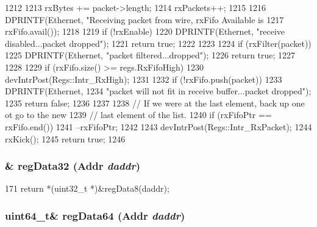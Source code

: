 \begin{DoxyCode}
1212 {
1213     rxBytes += packet->length;
1214     rxPackets++;
1215 
1216     DPRINTF(Ethernet, "Receiving packet from wire, rxFifo Available is %
1217             rxFifo.avail());
1218 
1219     if (!rxEnable) {
1220         DPRINTF(Ethernet, "receive disabled...packet dropped\n");
1221         return true;
1222     }
1223 
1224     if (rxFilter(packet)) {
1225         DPRINTF(Ethernet, "packet filtered...dropped\n");
1226         return true;
1227     }
1228 
1229     if (rxFifo.size() >= regs.RxFifoHigh)
1230         devIntrPost(Regs::Intr_RxHigh);
1231 
1232     if (!rxFifo.push(packet)) {
1233         DPRINTF(Ethernet,
1234                 "packet will not fit in receive buffer...packet dropped\n");
1235         return false;
1236     }
1237 
1238     // If we were at the last element, back up one ot go to the new
1239     // last element of the list.
1240     if (rxFifoPtr == rxFifo.end())
1241         --rxFifoPtr;
1242 
1243     devIntrPost(Regs::Intr_RxPacket);
1244     rxKick();
1245     return true;
1246 }
\end{DoxyCode}
\hypertarget{classSinic_1_1Device_af3697c3ddcc9030231a62c95ddcd193b}{
\subsubsection[{regData32}]{\& regData32 ({\bf Addr} {\em daddr})}}
\label{classSinic_1_1Device_af3697c3ddcc9030231a62c95ddcd193b}



\begin{DoxyCode}
171 { return *(uint32_t *)&regData8(daddr); }
\end{DoxyCode}
\hypertarget{classSinic_1_1Device_a107fa1384335bcf976734520e213a501}{
\subsubsection[{regData64}]{\setlength{\rightskip}{0pt plus 5cm}uint64\_\-t\& regData64 ({\bf Addr} {\em daddr})}}
\label{classSinic_1_1Device_a107fa1384335bcf976734520e213a501}



